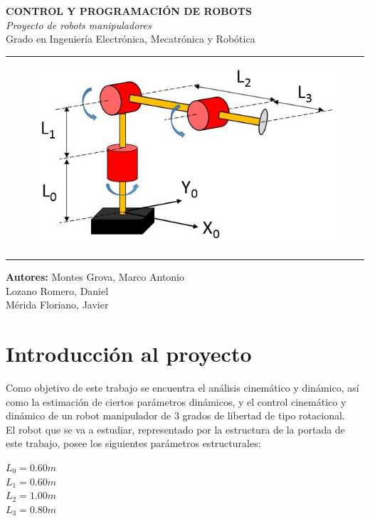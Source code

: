 \documentclass[a4paper,twoside]{article}
\begin{document}
\begin{titlepage}
	\centering
\Huge{\textbf{CONTROL Y PROGRAMACIÓN DE ROBOTS}} \\
\Huge{\textit{Proyecto de robots manipuladores}}\\

\vspace{1cm}
\LARGE{Grado en Ingeniería Electrónica, Mecatrónica y Robótica}\\
\rule{\textwidth}{0.1mm}
\begin{figure}[h!]
	\centering
	\includegraphics[width=1\textwidth]{brazo_portada}
\end{figure}
\vspace{3cm}
\rule{\textwidth}{0.1mm}
\Large{\textbf{Autores:} Montes Grova, Marco Antonio\\
 Lozano Romero, Daniel\\
 Mérida Floriano, Javier}
\end{titlepage}
\tableofcontents
\newpage
\section{Introducción al proyecto}
	Como objetivo de este trabajo se encuentra el análisis cinemático y dinámico, así como la estimación de ciertos parámetros dinámicos, y el control cinemático y dinámico de un robot manipulador de 3 grados de libertad de tipo rotacional.\\
	
	El robot que se va a estudiar, representado por la estructura de la portada de este trabajo, posee los siguientes parámetros estructurales:
	\begin{center}
		$L_0 = 0.60 m$\\$L_1 = 0.60 m$\\$L_2 = 1.00 m$\\$L_3 = 0.80 m$\\
	\end{center}
	
\end{document}
